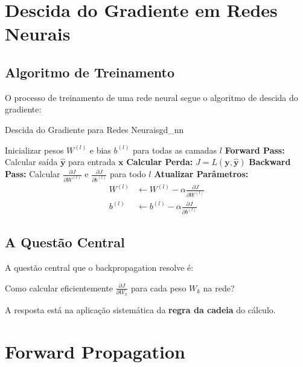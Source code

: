 \documentclass[a4paper,12pt]{article}
\newcommand{\highlight}[1]{{\color{nes_dark_orange}\textbf{#1}}}
\newcommand{\grad}[2]{\frac{\partial #1}{\partial #2}}
\begin{document}
\section{Descida do Gradiente em Redes Neurais}

\subsection{Algoritmo de Treinamento}

O processo de treinamento de uma rede neural segue o algoritmo de descida do gradiente:

\begin{algoritmo}{Descida do Gradiente para Redes Neurais}{gd_nn}
\begin{algorithmic}[1]
    \STATE Inicializar pesos $W^{(l)}$ e bias $b^{(l)}$ para todas as camadas $l$
    \REPEAT
        \STATE \textbf{Forward Pass:} Calcular saída $\hat{\mathbf{y}}$ para entrada $\mathbf{x}$
        \STATE \textbf{Calcular Perda:} $J = L(\mathbf{y}, \hat{\mathbf{y}})$
        \STATE \textbf{Backward Pass:} Calcular $\grad{J}{W^{(l)}}$ e $\grad{J}{b^{(l)}}$ para todo $l$
        \STATE \textbf{Atualizar Parâmetros:}
        \begin{align}
            W^{(l)} &\leftarrow W^{(l)} - \alpha \grad{J}{W^{(l)}} \\
            b^{(l)} &\leftarrow b^{(l)} - \alpha \grad{J}{b^{(l)}}
        \end{align}
\end{algorithmic}
\end{algoritmo}

\subsection{A Questão Central}

A questão central que o backpropagation resolve é:

\begin{center}
    \Large
    Como calcular eficientemente $\grad{J}{W_k}$ para cada peso $W_k$ na rede?
\end{center}

A resposta está na aplicação sistemática da \highlight{regra da cadeia} do cálculo.

\section{Forward Propagation}
\end{document}
